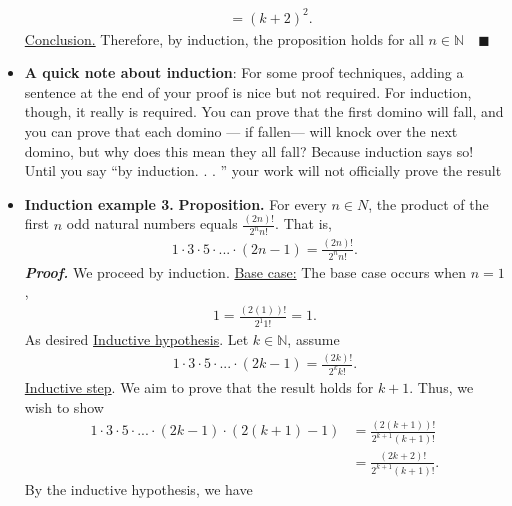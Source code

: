 \documentclass{report}
\begin{document}
\begin{itemize}
{\begin{align*}
                                      &= (k+2)^{2}
                .\end{align*}
            }
            \underline{Conclusion.} Therefore, by induction, the proposition holds for all $n\in \mathbb{N} \quad \blacksquare$
        \item \textbf{A quick note about induction}: For some proof techniques, adding a sentence at the end of your proof is nice but not required. For induction, though, it really is required. You can prove that the first domino will fall, and you can prove that each domino — if fallen— will knock over the next domino, but why does this mean they all fall? Because induction says so! Until you say “by induction. . . ” your work will not officially prove the result
        \item \textbf{Induction example 3.}
            \bigbreak \noindent 
            \textbf{Proposition.} For every $n \in N$, the product of the first $n$ odd natural numbers equals $\frac{(2n)!}{2^{n}n!} $. That is, 
            \begin{align*}
                1 \cdot  3 \cdot 5 \cdot ... \cdot (2n-1) = \frac{(2n)!}{2^{n}n!}
            .\end{align*}
            \bigbreak \noindent 
            \textbf{\textit{Proof.}} We proceed by induction.
            \bigbreak \noindent 
            \underline{Base case:} The base case occurs when $n=1$, 
            \begin{align*}
                1 = \frac{(2(1))!}{2^{1}1!} = 1
            .\end{align*}
            As desired
            \bigbreak \noindent 
            \underline{Inductive hypothesis}. Let $k\in \mathbb{N}$, assume
            \begin{align*}
                1 \cdot 3 \cdot 5 \cdot ... \cdot (2k-1) = \frac{(2k)!}{2^{k}k!}
            .\end{align*}
            \bigbreak \noindent 
            \underline{Inductive step}. We aim to prove that the result holds for $k+1$. Thus, we wish to show
            \begin{align*}
                1 \cdot 3 \cdot 5 \cdot ... \cdot (2k-1) \cdot (2(k+1)-1) &= \frac{(2(k+1))!}{2^{k+1}(k+1)!}\\
                                                                          &=\frac{(2k+2)!}{2^{k+1}(k+1)!}
            .\end{align*}
            By the inductive hypothesis, we have
            \begin{align*}

\end{align*}
\end{itemize}
\end{document}
